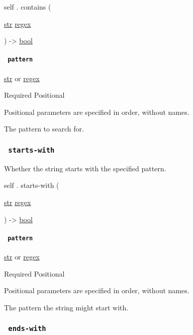 self { . } { contains } (

{ \href{/docs/reference/foundations/str/}{str}
\href{/docs/reference/foundations/regex/}{regex} }

) -\textgreater{} \href{/docs/reference/foundations/bool/}{bool}

\paragraph{\texorpdfstring{\texttt{\ pattern\ }}{ pattern }}\label{definitions-contains-pattern}

\href{/docs/reference/foundations/str/}{str} {or}
\href{/docs/reference/foundations/regex/}{regex}

{Required} {{ Positional }}

\label{definitions-contains-pattern-positional-tooltip}
Positional parameters are specified in order, without names.

The pattern to search for.

\subsubsection{\texorpdfstring{\texttt{\ starts-with\ }}{ starts-with }}\label{definitions-starts-with}

Whether the string starts with the specified pattern.

self { . } { starts-with } (

{ \href{/docs/reference/foundations/str/}{str}
\href{/docs/reference/foundations/regex/}{regex} }

) -\textgreater{} \href{/docs/reference/foundations/bool/}{bool}

\paragraph{\texorpdfstring{\texttt{\ pattern\ }}{ pattern }}\label{definitions-starts-with-pattern}

\href{/docs/reference/foundations/str/}{str} {or}
\href{/docs/reference/foundations/regex/}{regex}

{Required} {{ Positional }}

\label{definitions-starts-with-pattern-positional-tooltip}
Positional parameters are specified in order, without names.

The pattern the string might start with.

\subsubsection{\texorpdfstring{\texttt{\ ends-with\ }}{ ends-with }}\label{definitions-ends-with}

